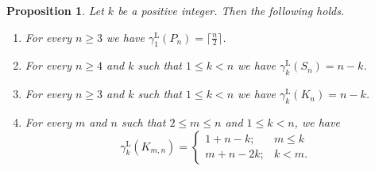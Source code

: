 \documentclass[11pt]{article}
\newtheorem{proposition}[theorem]{Proposition}
\newcommand{\gammakL}{\gamma_k^{\mathrm L}}
\newcommand{\gammaenaL}{\gamma_1^{\mathrm L}}
\begin{document}
\begin{proposition}
\label{families}
Let $k$ be a positive integer. Then the following holds.
\begin{enumerate}[label=(\roman*)]
\item For every $n\geq 3$ we have $\gammaenaL(P_n) = \lceil\frac n2\rceil$.
\item For every $n\geq 4$ and $k$ such that $1\leq k<n$ we have $\gammakL(S_n) = n - k$. 
\item\label{polni} For every $n\geq 3$ and $k$ such that $1\leq k<n$ we have $\gammakL(K_n) = n - k$.


\item For every $m$ and $n$ such that $2\leq m\leq n$ and $1\leq k< n$, we have
$$\gammakL(K_{m,n})=\left\{\begin{array}{ccl}
1+n-k;&m\leq k\\
m+n-2k;&k<m.
\end{array}\right.$$
\end{enumerate}
\end{proposition}
\end{document}
